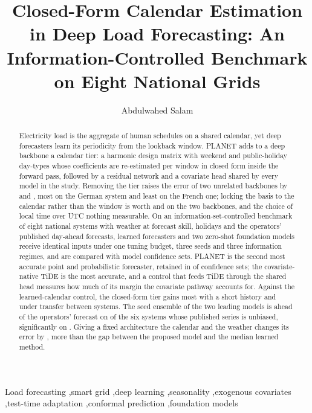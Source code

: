 \documentclass[preprint,12pt]{elsarticle}
\begin{document}
\begin{frontmatter}

\title{Closed-Form Calendar Estimation in Deep Load Forecasting: An Information-Controlled Benchmark on Eight National Grids}

\author[a]{Abdulwahed Salam}

\begin{abstract}
Electricity load is the aggregate of human schedules on a shared calendar, yet deep
forecasters learn its periodicity from the lookback window. PLANET adds to a deep backbone a
calendar tier: a harmonic design matrix with weekend and public-holiday day-types whose
coefficients are re-estimated per window in closed form inside the forward pass, followed by
a residual network and a covariate head shared by every model in the study. Removing the tier
raises the error of two unrelated backbones by  and
, most on the German system and least on the
French one; locking the basis to the calendar rather than the window is worth
 and  on the two
backbones, and the choice of local time over UTC nothing measurable. On an information-set-controlled benchmark of eight national systems with weather
at forecast skill, holidays and the operators' published day-ahead forecasts,
 learned forecasters and two zero-shot foundation models receive
identical inputs under one tuning budget, three seeds and three information regimes, and are
compared with model confidence sets. PLANET is the second most accurate point and
probabilistic forecaster, retained in  of 
confidence sets; the covariate-native TiDE is the most accurate, and a control that feeds
TiDE through the shared head measures how much of its margin the covariate pathway accounts
for. Against the learned-calendar control, the closed-form tier gains most with a short
history and under transfer between systems. The seed ensemble of the two leading models is ahead of the operators' forecast on
 of the six systems whose published series is
unbiased, significantly on . Giving a fixed architecture the calendar and the weather changes
its error by , more than the gap between the proposed model and the median learned method.
\end{abstract}

\begin{keyword}
Load forecasting \sep smart grid \sep deep learning \sep seasonality \sep exogenous covariates
\sep test-time adaptation \sep conformal prediction \sep foundation models
\end{keyword}

\end{frontmatter}
\end{document}
